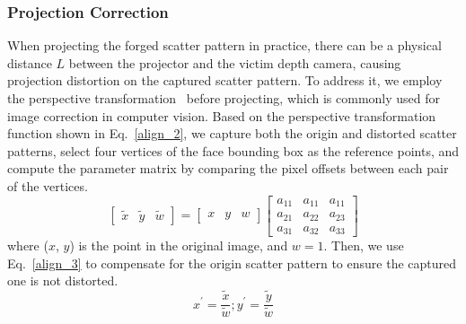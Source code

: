 \subsubsection{Projection Correction}
When projecting the forged scatter pattern in practice, there can be a physical distance $L$ between the projector and the victim depth camera, causing projection distortion on the captured scatter pattern. To address it, we employ the perspective transformation~\cite{opencv_library} before projecting, which is commonly used for image correction in computer vision. Based on the perspective transformation function shown in Eq.~\ref{align_2}, we capture both the origin and distorted scatter patterns, select four vertices of the face bounding box as the reference points, and compute the parameter matrix by comparing the pixel offsets between each pair of the vertices.
\begin{equation}
	\begin{bmatrix} \tilde{x} & \tilde{y} & \tilde{w}\end{bmatrix} = \begin{bmatrix} x&y&w\end{bmatrix}
	\begin{bmatrix} 
		a_{11}&a_{11}&a_{11} \\
		a_{21}&a_{22}&a_{23} \\
		a_{31}&a_{32}&a_{33} 
	\end{bmatrix}
	\label{align_2}
\end{equation}
where ($x$, $y$) is the point in the original image, and $w = 1$. 
Then, we use Eq.~\ref{align_3} to compensate for the origin scatter pattern to ensure the captured one is not distorted.
\begin{equation}
	x^{'} = \frac{\tilde{x}}{\tilde{w}};
	y^{'} = \frac{\tilde{y}}{\tilde{w}}
	\label{align_3}
\end{equation}

%


